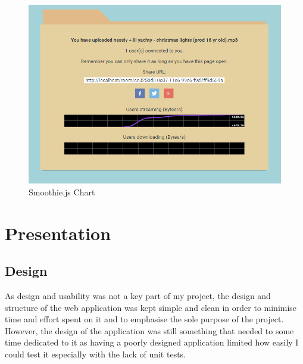 \documentclass[]{report}
\begin{document}
				\begin{figure}[H]
					\caption{Smoothie.js Chart}
					\centering
					\includegraphics[scale=0.5]{smoothie-js.png}
				\end{figure}
			
		\section{Presentation}
			\subsection{Design}			
				As design and usability was not a key part of my project, the design and structure of the web application was kept simple and clean in order to minimise time and effort spent on it and to emphasise the sole purpose of the project. However, the design of the application was still something that needed to some time dedicated to it as having a poorly designed application limited how easily I could test it especially with the lack of unit tests.
				
\end{document}
